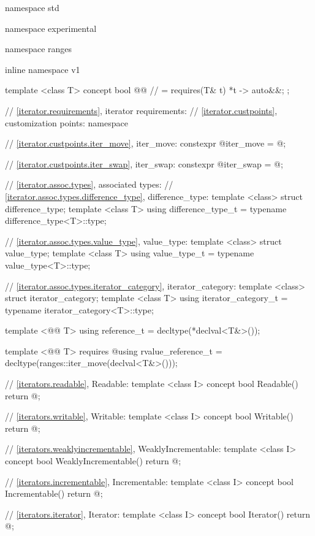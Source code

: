 %
\begin{codeblock}
namespace std { namespace experimental { namespace ranges { inline namespace v1 {
  template <class T> concept bool @@ // \expos
    = requires(T& t) { {*t} -> auto&&; };

  // \ref{iterator.requirements}, iterator requirements:
  // \ref{iterator.custpoints}, customization points:
  namespace {
    // \ref{iterator.custpoints.iter_move}, iter_move:
    constexpr @\unspec@ iter_move = @\unspec@;

    // \ref{iterator.custpoints.iter_swap}, iter_swap:
    constexpr @\unspec@ iter_swap = @\unspec@;
  }

  // \ref{iterator.assoc.types}, associated types:
  // \ref{iterator.assoc.types.difference_type}, difference_type:
  template <class> struct difference_type;
  template <class T> using difference_type_t
    = typename difference_type<T>::type;

  // \ref{iterator.assoc.types.value_type}, value_type:
  template <class> struct value_type;
  template <class T> using value_type_t
    = typename value_type<T>::type;

  // \ref{iterator.assoc.types.iterator_category}, iterator_category:
  template <class> struct iterator_category;
  template <class T> using iterator_category_t
    = typename iterator_category<T>::type;

  template <@@ T> using reference_t
    = decltype(*declval<T&>());

  template <@@ T>
      requires @\seebelow@ using rvalue_reference_t
    = decltype(ranges::iter_move(declval<T&>()));

  // \ref{iterators.readable}, Readable:
  template <class I>
  concept bool Readable() {
    return @\seebelow@;
  }

  // \ref{iterators.writable}, Writable:
  template <class I>
  concept bool Writable() {
    return @\seebelow@;
  }

  // \ref{iterators.weaklyincrementable}, WeaklyIncrementable:
  template <class I>
  concept bool WeaklyIncrementable() {
    return @\seebelow@;
  }

  // \ref{iterators.incrementable}, Incrementable:
  template <class I>
  concept bool Incrementable() {
    return @\seebelow@;
  }

  // \ref{iterators.iterator}, Iterator:
  template <class I>
  concept bool Iterator() {
    return @\seebelow@;
  }

}}}}
\end{codeblock}
